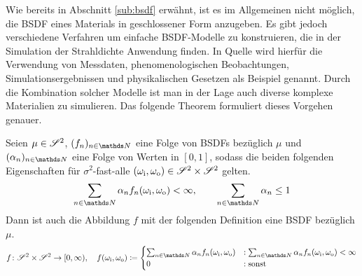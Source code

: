 		Wie bereits in Abschnitt \ref{sub:bsdf} erwähnt, ist es im Allgemeinen nicht möglich, die BSDF eines Materials in geschlossener Form anzugeben.
		Es gibt jedoch verschiedene Verfahren um einfache BSDF-Modelle zu konstruieren, die in der Simulation der Strahldichte Anwendung finden.
		In Quelle \cite[S.~507~f]{pbrt3} wird hierfür die Verwendung von Messdaten, phenomenologischen Beobachtungen, Simulationsergebnissen und physikalischen Gesetzen als Beispiel genannt.
		Durch die Kombination solcher Modelle ist man in der Lage auch diverse komplexe Materialien zu simulieren.
		Das folgende Theorem formuliert dieses Vorgehen genauer.
		\begin{theorem*}
			Seien $\mu\in\mathscr{S}^{2}$, $(f_n)_{n\in\SN}$ eine Folge von BSDFs bezüglich $\mu$ und $(\alpha_n)_{n\in\SN}$ eine Folge von Werten in $[0,1]$, sodass die beiden folgenden Eigenschaften für $\sigma^2$-fast-alle $(\omega_{\mathrm{i}},\omega_{\mathrm{o}})\in\mathscr{S}^{2}\times\mathscr{S}^{2}$ gelten.
			\[
				\sum_{n\in\SN}\alpha_n f_n(\omega_\m{i},\omega_\m{o}) < \infty ,\qquad \sum_{n\in\SN}\alpha_n \leq 1
			\]
			Dann ist auch die Abbildung $f$ mit der folgenden Definition eine BSDF bezüglich $\mu$.
			\[
				\func{f}{\ssp\times\ssp}{[0,\infty)},\quad f(\omega_\m{i},\omega_\m{o})\define
				\begin{cases}
					\sum_{n\in\SN}\alpha_n f_n(\omega_\m{i},\omega_\m{o}) &: \sum_{n\in\SN}\alpha_n f_n(\omega_\m{i},\omega_\m{o}) < \infty \\
					0 &: \m{sonst}
				\end{cases}
			\]
		\end{theorem*}

